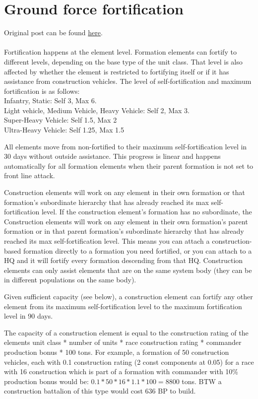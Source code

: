 \documentclass[../../Aurora C# unofficial manual.tex]{subfiles}
\begin{document}
	\section{Ground force fortification}
	Original post can be found
	\href{http://aurora2.pentarch.org/index.php?topic=8495.msg110539#msg110539}{here}.
	\\\\
	
	Fortification happens at the element level. Formation elements can fortify to different levels, depending on the base type of the unit class. That level is also affected by whether the element is restricted to fortifying itself or if it has assistance from construction vehicles. The level of self-fortification and maximum fortification is as follows:\\
	Infantry, Static: Self 3, Max 6.\\
	Light vehicle, Medium Vehicle, Heavy Vehicle: Self 2, Max 3.\\
	Super-Heavy Vehicle: Self 1.5, Max 2\\
	Ultra-Heavy Vehicle: Self 1.25, Max 1.5
	
	All elements move from non-fortified to their maximum self-fortification level in 30 days without outside assistance. This progress is linear and happens automatically for all formation elements when their parent formation is not set to front line attack.
	
	Construction elements will work on any element in their own formation or that formation's subordinate hierarchy that has already reached its max self-fortification level. If the construction element's formation has no subordinate, the Construction elements will work on any element in their own formation's parent formation or in that parent formation's subordinate hierarchy that has already reached its max self-fortification level. This means you can attach a construction-based formation directly to a formation you need fortified, or you can attach to a HQ and it will fortify every formation descending from that HQ. Construction elements can only assist elements that are on the same system body (they can be in different populations on the same body).
	
	Given sufficient capacity (see below), a construction element can fortify any other element from its maximum self-fortification level to the maximum fortification level in 90 days.
	
	The capacity of a construction element is equal to the construction rating of the elements unit class * number of units * race construction rating * commander production bonus * 100 tons. For example, a formation of 50 construction vehicles, each with 0.1 construction rating (2 const components at 0.05) for a race with 16 construction which is part of a formation with commander with 10\% production bonus would be: \( 0.1 * 50 * 16 * 1.1 * 100 = 8800 \) tons. BTW a construction battalion of this type would cost 636 BP to build.
	
\end{document}
